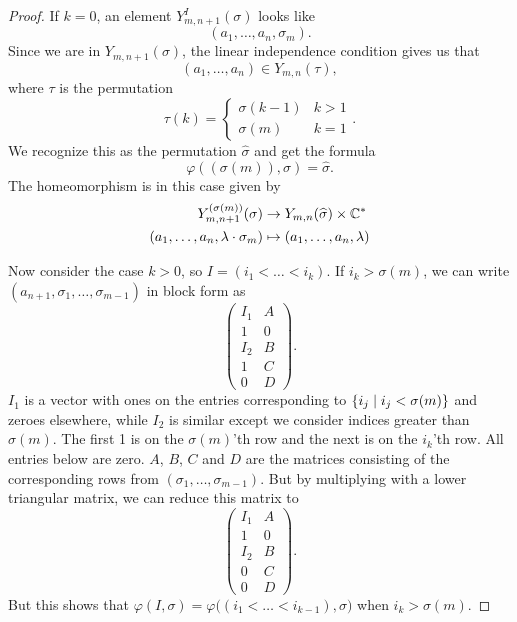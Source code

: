 \begin{proof}
  If $k = 0$, an element $Y^I_{m,n+1}(\sigma)$ looks like
  \[ (a_1,\dots,a_n,\sigma_m). \]
  Since we are in $Y_{m,n+1}(\sigma)$, the linear independence
  condition gives us that
  \[ (a_1,\dots,a_n) \in Y_{m,n}(\tau), \]
  where $\tau$ is the permutation
  \[ \tau(k) =
  \begin{cases}
    \sigma(k-1) & k > 1 \\
    \sigma(m) & k = 1
  \end{cases}. \]
  We recognize this as the permutation $\widehat\sigma$ and get the
  formula
  \[ \varphi((\sigma(m)),\sigma) = \widehat\sigma. \]
  The homeomorphism is in this case given by
  \begin{align*}
    Y_{m,n+1}^{(\sigma(m))}(\sigma) &\to Y_{m,n}(\widehat\sigma)\times
                                      \mathbb{C}^* \\
    (a_1,\dots,a_n,\lambda\cdot\sigma_m) &\mapsto
                                           (a_1,\dots,a_n,\lambda)
  \end{align*}
  
  Now consider the case $k > 0$, so $I = (i_1 < \dots < i_k)$. If $i_k
  > \sigma(m)$, we can write
  $(a_{n+1},\sigma_1,\dots,\sigma_{m-1})$ in block form as
  \[
  \begin{pmatrix}
    I_1 & A \\
    1 & 0 \\
    I_2 & B \\
    1 & C \\
    0 & D
  \end{pmatrix}.
  \]
  $I_1$ is a vector with ones on the entries corresponding
  to $\left\{ i_j \mid i_j < \sigma(m) \right\}$ and zeroes elsewhere, while
  $I_2$ is similar except we consider indices greater than
  $\sigma(m)$. The first 1 is on the $\sigma(m)$'th row and the next
  is on the $i_k$'th row. All entries below are zero. $A$, $B$, $C$
  and $D$ are the matrices consisting of the corresponding rows from
  $(\sigma_1,\dots,\sigma_{m-1})$. But by multiplying with a lower
  triangular matrix, we can reduce this matrix to
  \[
  \begin{pmatrix}
    I_1 & A \\
    1 & 0 \\
    I_2 & B \\
    0 & C \\
    0 & D
  \end{pmatrix}.
  \]
  But this shows that $\varphi(I,\sigma) =
  \varphi\big((i_1<\dots<i_{k-1}),\sigma\big)$ when $i_k >
  \sigma(m)$.


\end{proof}
